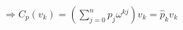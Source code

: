 \documentclass[preview]{standalone}
\begin{document}
\begin{align*}
\Rightarrow C_p(v_k) = \left( \sum_{j=0}^n p_j \omega^{kj} \right) v_k = \hat{p}_k v_k
\end{align*}
\end{document}
